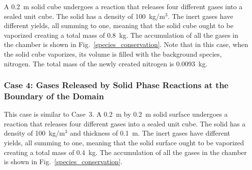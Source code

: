 \documentclass[11pt]{book}
\begin{document}
A 0.2~m solid cube undergoes a reaction that releases four different gases into a sealed unit cube. The solid has a density of 100~kg/m$^3$. The inert gases have different yields, all summing to one, meaning that the solid cube ought to be vaporized creating a total mass of 0.8~kg. The accumulation of all the gases in the chamber is shown in Fig.~\ref{species_conservation}. Note that in this case, when the solid cube vaporizes, its volume is filled with the background species, nitrogen. The total mass of the newly created nitrogen is 0.0093~kg.

\subsubsection{Case 4: Gases Released by Solid Phase Reactions at the Boundary of the Domain}

This case is similar to Case~3. A 0.2~m by 0.2~m solid surface undergoes a reaction that releases four different gases into a sealed unit cube. The solid has a density of 100~kg/m$^3$ and thickness of 0.1~m. The inert gases have different yields, all summing to one, meaning that the solid surface ought to be vaporized creating a total mass of 0.4~kg. The accumulation of all the gases in the chamber is shown in Fig.~\ref{species_conservation}.
\end{document}

